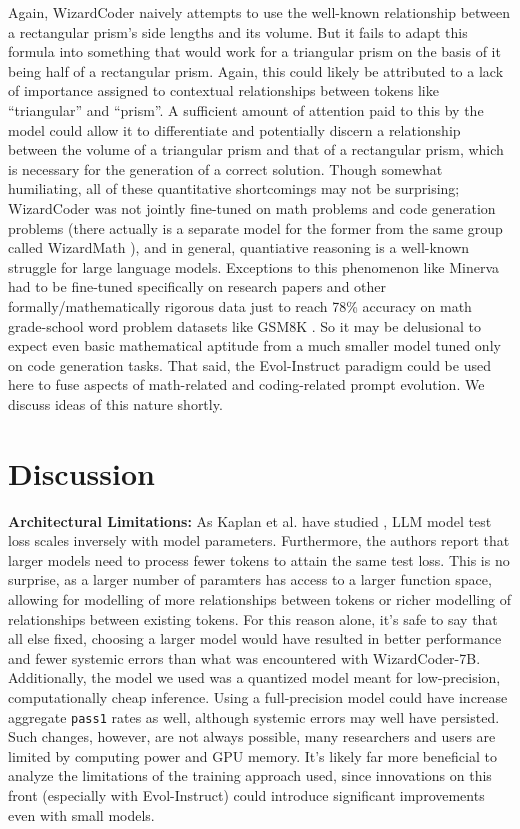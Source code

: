 \documentclass[10pt]{article}
\newcommand{\code}[1]{\texttt{#1}}
\theoremstyle{definition}
\begin{document}
Again, WizardCoder naively attempts to use the well-known relationship between a rectangular prism's side lengths and its volume. But it fails to adapt this formula into something that would work for a triangular prism on the basis of it being half of a rectangular prism. Again, this could likely be attributed to a lack of importance assigned to contextual relationships between tokens like   ``triangular'' and ``prism''. A sufficient amount of attention paid to this by the model could allow it to differentiate and potentially discern a relationship between the volume of a triangular prism and that of a rectangular prism, which is necessary for the generation of a correct solution. Though somewhat humiliating, all of these quantitative shortcomings may not be surprising; WizardCoder was not jointly fine-tuned on math problems and code generation problems (there actually is a separate model for the former from the same group called WizardMath \cite{wizardmath}), and in general, quantiative reasoning is a well-known struggle for large language models. Exceptions to this phenomenon like Minerva \cite{googlequantreasoning} had to be fine-tuned specifically on research papers and other formally/mathematically rigorous data just to reach 78\% accuracy on math grade-school word problem datasets like GSM8K \cite{mathtraining}. So it may be delusional to expect even basic mathematical aptitude from a much smaller model tuned only on code generation tasks. That said, the Evol-Instruct paradigm could be used here to fuse aspects of math-related and coding-related prompt evolution. We discuss ideas of this nature shortly.

\section{Discussion}
\noindent\textbf{Architectural Limitations:} As Kaplan et al. have studied \cite{kaplanscaling}, LLM model test loss scales inversely with model parameters. Furthermore, the authors report that larger models need to process fewer tokens to attain the same test loss. This is no surprise, as a larger number of paramters has access to a larger function space, allowing for modelling of more relationships between tokens or richer modelling of relationships between existing tokens. For this reason alone, it's safe to say that all else fixed, choosing a larger model would have resulted in better performance and fewer systemic errors than what was encountered with WizardCoder-7B. Additionally, the model we used was a quantized model meant for low-precision, computationally cheap inference. Using a full-precision model could have increase aggregate \code{pass1} rates as well, although systemic errors may well have persisted. Such changes, however, are not always possible, many researchers and users are limited by computing power and GPU memory. It's likely far more beneficial to analyze the limitations of the training approach used, since innovations on this front (especially with Evol-Instruct) could introduce significant improvements even with small models.\\
\end{document}
